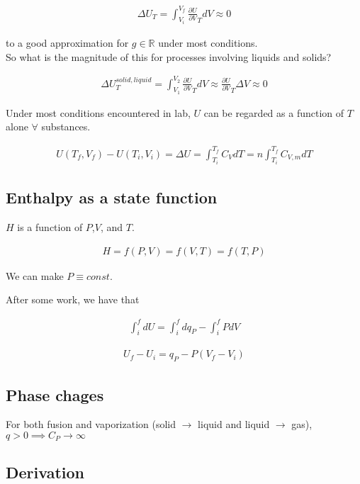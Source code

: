 \documentclass[12pt]{article}
\begin{document}
\begin{align*}
    \Delta U_T=\int_{V_i}^{V_f}\frac{\partial U}{\partial V}_T dV\approx 0
\end{align*}

to a good approximation for $g\in \mathbb{R}$ under most conditions.\\ So what is the magnitude of this for processes involving liquids and solids?

\begin{align*}
    \Delta U_T^{solid,liquid}=\int_{V_1}^{V_2}\frac{\partial U}{\partial V}_T dV\approx \frac{\partial U}{\partial V}_T\Delta V\approx 0
\end{align*}

Under most conditions encountered in lab, $U$ can be regarded as a function of $T$ alone $\forall$ substances.

\begin{align*}
    U(T_f,V_f)-U(T_i,V_i)=\Delta U=\int_{T_i}^{T_f}C_V dT=n\int_{T_i}^{T_f}C_{V,m}dT
\end{align*}

\subsection*{Enthalpy as a state function}

$H$ is a function of $P$,$V$, and $T$.

\begin{align*}
    H=f(P,V)=f(V,T)=f(T,P)
\end{align*}

We can make $P\equiv const$.

After some work, we have that

\begin{align*}
    \int_{i}^{f}dU=\int_{i}^{f}dq_P-\int_{i}^{f}PdV
\end{align*}

\begin{align*}
    U_f-U_i=q_P-P(V_f-V_i)
\end{align*}

\subsection*{Phase chages}

For both fusion and vaporization (solid $\rightarrow$ liquid and liquid $\rightarrow$ gas), $q>0\implies C_P\rightarrow \infty$

\subsection*{Derivation}
\end{document}
